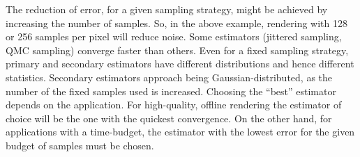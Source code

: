 The reduction of error, for a given sampling strategy, might be achieved by increasing the number of samples. So, in the above example, rendering with 128 or 256 samples per pixel will reduce noise. 
Some estimators (jittered sampling, QMC sampling) converge faster than others. Even for a fixed sampling strategy, primary and secondary estimators have different distributions and hence different statistics. Secondary estimators approach being Gaussian-distributed, as the number of the fixed samples used is increased. Choosing the ``best'' estimator depends on the application. For high-quality, offline rendering the estimator of choice will be the one with the quickest convergence. On the other hand, for applications with a time-budget, the estimator with the lowest error for the given budget of samples must be chosen.

